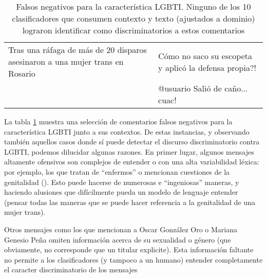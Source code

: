 \begin{table}[t]
\begin{tabularx}{\textwidth}{X X}
        Tras una ráfaga de más de 20 disparos asesinaron a una mujer trans en Rosario & Cómo no saco su escopeta y aplicó la defensa propia?! \\
        & @usuario Salió de caño... cuac!	\\
    \end{tabularx}
    \caption{Falsos negativos para la característica LGBTI. Ninguno de los 10 clasificadores que consumen contexto y texto (ajustados a dominio) lograron identificar como discriminatorios a estos comentarios }
    \label{tab:lgbti_error_analysis}
\end{table}

La tabla \ref{tab:lgbti_error_analysis} muestra una selección de comentarios falsos negativos para la característica LGBTI junto a sus contextos. De estas instancias, y observando también aquellos casos donde sí puede detectar el discurso discriminatorio contra LGBTI, podemos dilucidar algunas razones. En primer lugar, algunos mensajes altamente ofensivos son complejos de entender o con una alta variabilidad léxica: por ejemplo, los que tratan de ``enfermos'' o mencionan cuestiones de la genitalidad (). Esto puede hacerse de numerosas e ``ingeniosas'' maneras, y haciendo alusiones que difícilmente pueda un modelo de lenguaje entender (pensar todas las maneras que se puede hacer referencia a la genitalidad de una mujer trans).

Otros mensajes como los que mencionan a Oscar González Oro o Mariana Genesio Peña omiten información acerca de su sexualidad o género (que obviamente, no corresponde que un titular explicite). Esta información faltante no permite a los clasificadores (y tampoco a un humano) entender completamente el caracter discriminatorio de los mensajes
